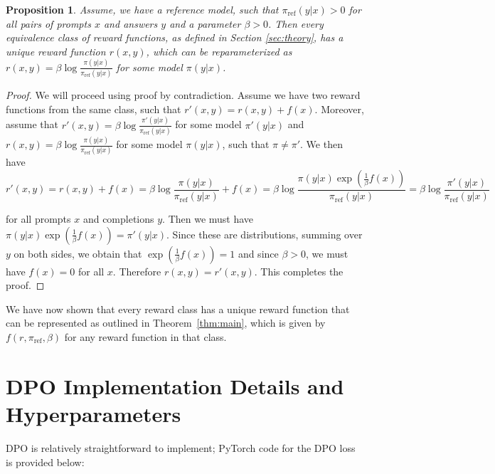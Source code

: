 \documentclass{article}
\newtheorem{proposition}{Proposition}
\begin{document}
\begin{proposition}\label{prop:unique}
Assume, we have a reference model, such that $\pi_\text{ref}(y|x)>0$ for all pairs of prompts $x$ and answers $y$ and a parameter $\beta>0$. Then every equivalence class of reward functions, as defined in Section \ref{sec:theory}, has a unique reward function $r(x, y)$, which can be reparameterized as $r(x, y) = \beta \log \frac{\pi(y|x)}{\pi_\text{ref}(y|x)}$ for some model $\pi(y|x)$.
\end{proposition}
\begin{proof}
    We will proceed using proof by contradiction. Assume we have two reward functions from the same class, such that $r'(x, y) = r(x, y) + f(x)$. Moreover, assume that  $r'(x, y) = \beta \log \frac{\pi'(y|x)}{\pi_\text{ref}(y|x)}$ for some model $\pi'(y|x)$ and  $r(x, y) = \beta \log \frac{\pi(y|x)}{\pi_\text{ref}(y|x)}$ for some model $\pi(y|x)$, such that $\pi\neq\pi'$. We then have
\begin{equation*}
        r'(x, y) = r(x, y) + f(x) = \beta \log \frac{\pi(y|x)}{\pi_\text{ref}(y|x)} + f(x) =  \beta \log \frac{\pi(y|x)\exp(\frac{1}{\beta} f(x))}{\pi_\text{ref}(y|x)}=\beta \log \frac{\pi'(y|x)}{\pi_\text{ref}(y|x)}
    \end{equation*}

    for all prompts $x$ and completions $y$. Then we must have $\pi(y|x)\exp(\frac{1}{\beta} f(x)) = \pi'(y|x)$. Since these are distributions, summing over $y$ on both sides, we obtain that $\exp(\frac{1}{\beta} f(x)) = 1$ and since $\beta>0$, we must have $f(x)=0$ for all $x$. Therefore $r(x,y) = r'(x,y)$. This completes the proof.
\end{proof}

We have now shown that every reward class has a unique reward function that can be represented as outlined in Theorem~\ref{thm:main}, which is given by $f(r, \pi_\text{ref}, \beta)$ for any reward function in that class.

\section{DPO Implementation Details and Hyperparameters}
\label{app:implementation}
DPO is relatively straightforward to implement; PyTorch code for the DPO loss is provided below:
\end{document}
